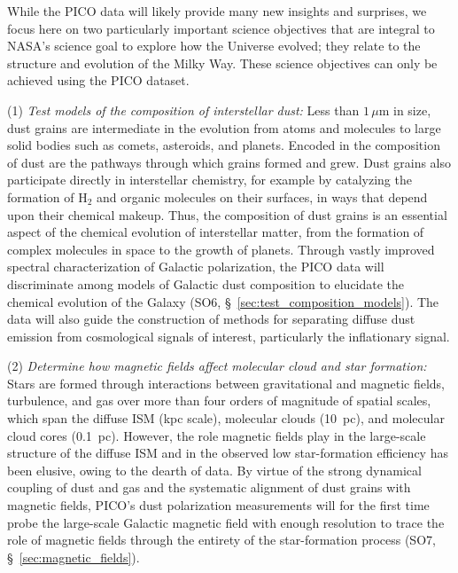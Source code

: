 \documentclass[PICOAPC.tex]{subfiles}
\begin{document}
While the PICO data will likely provide many new insights and surprises, we focus here on two particularly important science objectives that are integral to NASA's science goal to explore how the Universe evolved; they relate to the structure and evolution of the Milky Way. These science objectives can only be achieved using the PICO dataset.

(1) {\em Test models of the composition of interstellar dust:} 
Less than $1\,\mu$m in size, dust grains are intermediate in the evolution from atoms and molecules to large solid bodies such as comets, asteroids, and planets. Encoded in the composition of dust are the pathways through which grains formed and grew. Dust grains also participate directly in interstellar chemistry, for example by catalyzing the formation of H$_2$ and organic molecules on their surfaces, in ways that depend upon their chemical makeup. Thus, the composition of dust grains is an essential aspect of the chemical evolution of interstellar matter, from the formation of complex molecules in space to the growth of planets. Through vastly improved spectral characterization of Galactic polarization, the PICO data will discriminate among models of Galactic dust composition to elucidate the chemical evolution of the Galaxy (SO6, \S~\ref{sec:test_composition_models}). The data will also guide the construction of methods for separating diffuse dust emission from cosmological signals of interest, particularly the inflationary signal. 

(2) {\em Determine how magnetic fields affect molecular cloud and star formation:}
Stars are formed through interactions between gravitational and magnetic fields, turbulence, and gas over more than four orders of magnitude of spatial scales, which span the diffuse ISM (kpc scale), molecular clouds (10~pc), and molecular cloud cores (0.1~pc). However, the role magnetic fields play in the large-scale structure of the diffuse \ac{ISM} and in the observed low star-formation efficiency has been elusive, owing to the dearth of data. By virtue of the strong dynamical coupling of dust and gas and the systematic alignment of dust grains with magnetic fields, PICO's dust polarization measurements will for the first time probe the large-scale Galactic magnetic field with enough resolution to trace the role of magnetic fields through the entirety of the star-formation process (SO7, \S~\ref{sec:magnetic_fields}). 
\end{document}
